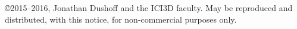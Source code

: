 \copyright 2015--2016, Jonathan Dushoff and the ICI3D faculty.  May be reproduced and distributed, with this notice, for non-commercial purposes only.

